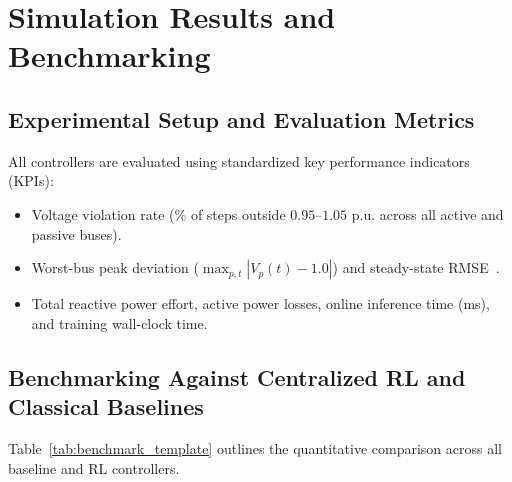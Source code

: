 \chapter{Simulation Results and Benchmarking}
\label{ch:results}

\section{Experimental Setup and Evaluation Metrics}
All controllers are evaluated using standardized key performance indicators (KPIs):
\begin{itemize}[noitemsep, topsep=2pt]
    \item Voltage violation rate (\% of steps outside $0.95\text{--}1.05\text{ p.u.}$ across all active and passive buses).
    \item Worst-bus peak deviation ($\max_{p,t} |V_p(t) - 1.0|$) and steady-state RMSE~\cite{Mughni2026}.
    \item Total reactive power effort, active power losses, online inference time (ms), and training wall-clock time.
\end{itemize}

\section{Benchmarking Against Centralized RL and Classical Baselines}
Table~\ref{tab:benchmark_template} outlines the quantitative comparison across all baseline and RL controllers.

